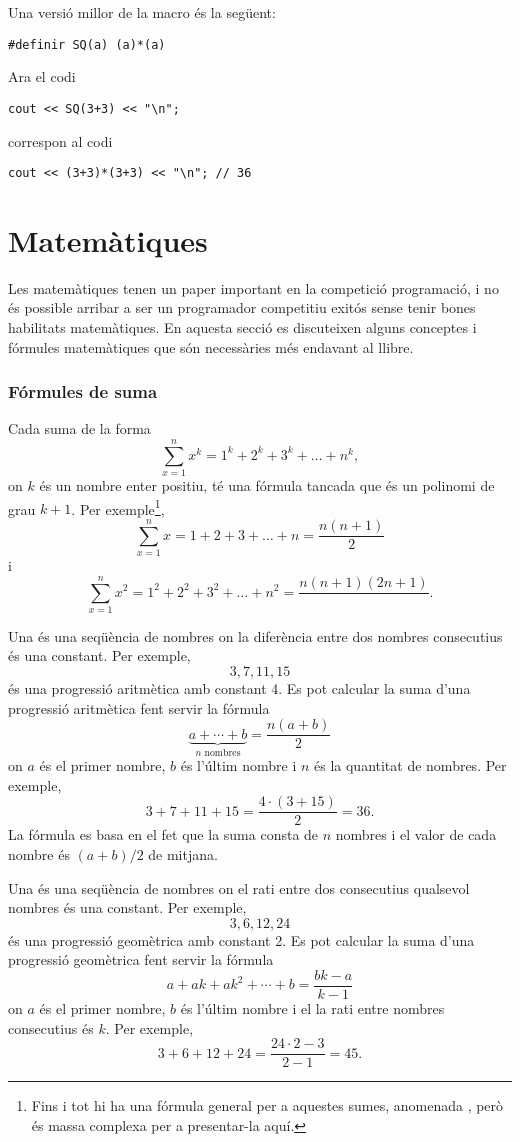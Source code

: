 Una versió millor de la macro és la següent:
\begin{lstlisting}
#definir SQ(a) (a)*(a)
\end{lstlisting}
Ara el codi
\begin{lstlisting}
cout << SQ(3+3) << "\n";
\end{lstlisting}
correspon al codi
\begin{lstlisting}
cout << (3+3)*(3+3) << "\n"; // 36
\end{lstlisting}


\section{Matemàtiques}

Les matemàtiques tenen un paper important en la competició
programació, i no és possible arribar a ser
un programador competitiu exitós sense
tenir bones habilitats matemàtiques.
En aquesta secció es discuteixen alguns conceptes
i fórmules matemàtiques que són necessàries
més endavant al llibre.

\subsubsection{Fórmules de suma}

Cada suma de la forma
\[\sum_{x=1}^n x^k = 1^k+2^k+3^k+\ldots+n^k,\]
on $k$ és un nombre enter positiu,
té una fórmula tancada que és un
polinomi de grau $k+1$.
Per exemple\footnote{
Fins i tot hi ha una fórmula general per a aquestes sumes,
anomenada ,
però és massa complexa per a presentar-la aquí.},
\[\sum_{x=1}^n x = 1+2+3+\ldots+n = \frac{n(n+1)}{2}\]
i
\[\sum_{x=1}^nx^2 = 1^2+2^2+3^2+\ldots+n^2 = \frac{n(n+1)(2n+1)}{ }.\]

Una  és una 
seqüència de nombres
on la diferència entre dos nombres consecutius 
és una constant.
Per exemple,
\[3, 7, 11, 15\]
és una progressió aritmètica amb constant 4.
Es pot calcular la suma d'una progressió aritmètica
fent servir la fórmula
\[\underbrace{a + \cdots + b}_{n \,\, \textrm{nombres}} = \frac{n(a+b)}{2}\]
on $a$ és el primer nombre,
$b$ és l'últim nombre i
$n$ és la quantitat de nombres.
Per exemple,
\[3+7+11+15=\frac{4 \cdot (3+15)}{2} = 36.\]
La fórmula es basa en el fet
que la suma consta de $n$ nombres i
el valor de cada nombre és $(a+b)/2$ de mitjana.

Una  és una seqüència
de nombres
on el rati entre dos consecutius qualsevol
nombres és una constant.
Per exemple,
\[3,6,12,24\]
és una progressió geomètrica amb constant 2.
Es pot calcular la suma d'una progressió geomètrica
fent servir la fórmula
\[a + ak + ak^2 + \cdots + b = \frac{bk-a}{k-1}\]
on $a$ és el primer nombre,
$b$ és l'últim nombre i el
la rati entre nombres consecutius és $k$.
Per exemple,
\[3+6+12+24=\frac{24 \cdot 2 - 3}{2-1} = 45.\]

